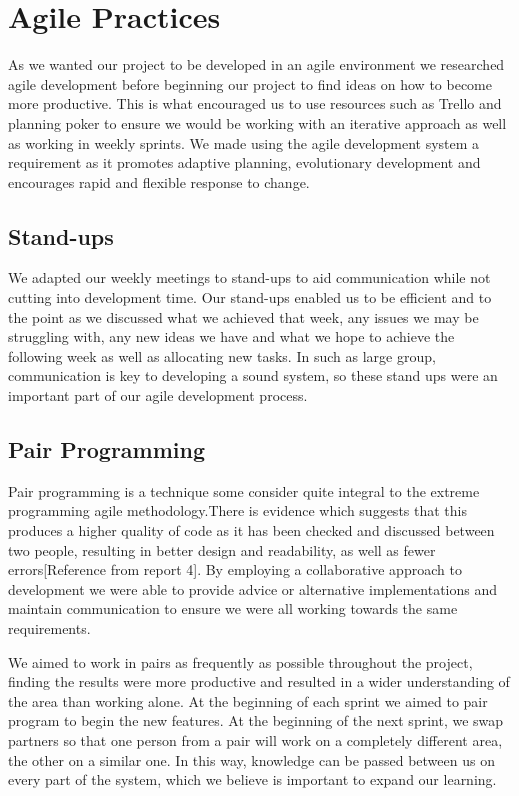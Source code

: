 \documentclass[11pt, a4paper]{report}
\begin{document}
\section{Agile Practices}

As we wanted our project to be developed in an agile environment we researched agile development before beginning our project to find ideas on how to become more productive. This is what encouraged us to use resources such as Trello and planning poker to ensure we would be working with an iterative approach as well as working in weekly sprints. We made using the agile development system a requirement as it promotes adaptive planning, evolutionary development and encourages rapid and flexible response to change.

\subsection{Stand-ups}

We adapted our weekly meetings to stand-ups to aid communication while not cutting into development time. Our stand-ups enabled us to be efficient and to the point as we discussed what we achieved that week, any issues we may be struggling with, any new ideas we have and what we hope to achieve the following week as well as allocating new tasks. In such as large group, communication is key to developing a sound system, so these stand ups were an important part of our agile development process. 

\subsection{Pair Programming}

Pair programming is a technique some consider quite integral to the extreme programming agile methodology.There is evidence which suggests that this produces a higher quality of code as it has been checked and discussed between two people, resulting in better design and readability, as well as fewer errors[Reference from report 4]. By employing a collaborative approach to development we were able to  provide advice or alternative implementations and maintain communication to ensure we were all working towards the same requirements. 

We aimed to work in pairs as frequently as possible throughout the project, finding the results were more productive and resulted in a wider understanding of the area than working alone. At the beginning of each sprint we aimed to pair program to begin the new features. At the beginning of the next sprint, we swap partners so that one person from a pair will work on a completely different area, the other on a similar one. In this way, knowledge can be passed between us on every part of the system, which we believe is important to expand our learning.
\end{document}
